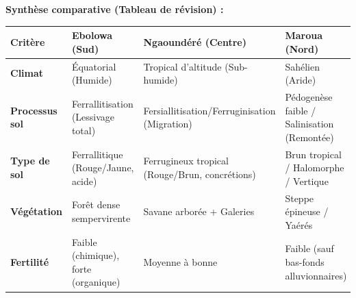 \documentclass[11pt]{article}
\begin{document}
\begin{exoresolu}
\textbf{Synthèse comparative (Tableau de révision) :}
\begin{center}
\begin{tabularx}{\linewidth}{|l|X|X|X|}\hline
\rowcolor{popblueL} \textbf{Critère} & \textbf{Ebolowa (Sud)} & \textbf{Ngaoundéré (Centre)} & \textbf{Maroua (Nord)} \\ \hline
\textbf{Climat} & Équatorial (Humide) & Tropical d'altitude (Sub-humide) & Sahélien (Aride) \\ \hline
\textbf{Processus sol} & Ferrallitisation (Lessivage total) & Fersiallitisation/Ferruginisation (Migration) & Pédogenèse faible / Salinisation (Remontée) \\ \hline
\textbf{Type de sol} & Ferrallitique (Rouge/Jaune, acide) & Ferrugineux tropical (Rouge/Brun, concrétions) & Brun tropical / Halomorphe / Vertique \\ \hline
\textbf{Végétation} & Forêt dense sempervirente & Savane arborée + Galeries & Steppe épineuse / Yaérés \\ \hline
\textbf{Fertilité} & Faible (chimique), forte (organique) & Moyenne à bonne & Faible (sauf bas-fonds alluvionnaires) \\ \hline
\end{tabularx}
\end{center}
\end{exoresolu}
\end{document}
